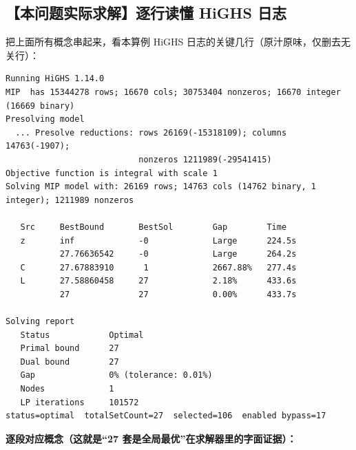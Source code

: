 \documentclass[11pt]{ctexart}
\begin{document}
\subsection{【本问题实际求解】逐行读懂 HiGHS 日志}
把上面所有概念串起来，看本算例 HiGHS 日志的关键几行（原汁原味，仅删去无关行）：
\begin{lstlisting}[style=codebox]
Running HiGHS 1.14.0
MIP  has 15344278 rows; 16670 cols; 30753404 nonzeros; 16670 integer (16669 binary)
Presolving model
  ... Presolve reductions: rows 26169(-15318109); columns 14763(-1907);
                           nonzeros 1211989(-29541415)
Objective function is integral with scale 1
Solving MIP model with: 26169 rows; 14763 cols (14762 binary, 1 integer); 1211989 nonzeros

   Src     BestBound       BestSol        Gap        Time
   z       inf             -0             Large      224.5s
           27.76636542     -0             Large      264.2s
   C       27.67883910      1             2667.88%   277.4s
   L       27.58860458     27             2.18%      433.6s
           27              27             0.00%      433.7s

Solving report
   Status            Optimal
   Primal bound      27
   Dual bound        27
   Gap               0% (tolerance: 0.01%)
   Nodes             1
   LP iterations     101572
status=optimal  totalSetCount=27  selected=106  enabled bypass=17
\end{lstlisting}
\textbf{逐段对应概念（这就是“27 套是全局最优”在求解器里的字面证据）：}
\end{document}
